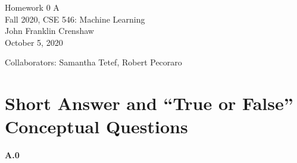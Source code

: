 \documentclass{article}
\renewcommand{\title}{Homework 0 A}
\renewcommand{\date}{October 5, 2020}
\begin{document}
\begin{center}
        \LARGE \title \\ \vspace{10pt}
        \normalsize 
        Fall 2020, CSE 546: Machine Learning \\ \vspace{2pt}
        John Franklin Crenshaw \\ \vspace{2pt}
        \date
\end{center}

Collaborators: Samantha Tetef, Robert Pecoraro 

\section*{Short Answer and ``True or False'' Conceptual Questions}

\textbf{A.0}
\end{document}

